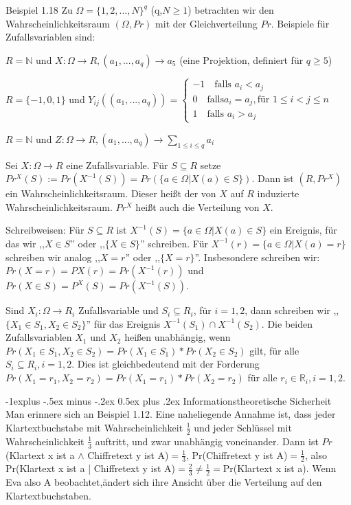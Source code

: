 \documentclass[a4paper]{article}
\makeatletter
\renewcommand{\subsection}{\@startsection{subsection}{2}{0mm}%
 {-1explus -.5ex minus -.2ex}%
 {0.5ex plus .2ex}%
 {\normalfont\normalsize\bfseries}}
\makeatother
\begin{document}
\begin{multicols}{3}
    Beispiel 1.18 Zu $\Omega=\{1,2,...,N\}^q$ (q,$N\geq 1$) betrachten wir den Wahrscheinlichkeitsraum $(\Omega,Pr)$ mit der Gleichverteilung $Pr$. Beispiele für Zufallsvariablen sind:
    \begin{itemize*}
        \item $R=\mathbb{N}$ und $X:\Omega\rightarrow R,(a_1,...,a_q)\rightarrow a_5$ (eine Projektion, definiert für $q\geq 5$)
        \item $R=\{-1,0,1\}$ und $Y_{ij}((a_1,...,a_q))=\begin{cases} -1\quad\text{falls } a_i< a_j\\ 0\quad\text{falls} a_i=a_j, \text{für } 1\leq i < j\leq n \\ 1\quad\text{falls } a_i> a_j\end{cases}$
        \item $R=\mathbb{N}$ und $Z:\Omega\rightarrow R,(a_1 ,...,a_q)\rightarrow\sum_{1\leq i\leq q} a_i$
    \end{itemize*}

    Sei $X:\Omega\rightarrow R$ eine Zufallsvariable. Für $S\subseteq R$ setze $Pr^X(S):= Pr(X^{-1}(S))=Pr(\{a\in\Omega|X(a)\in S\})$. Dann ist $(R,Pr^X)$ ein Wahrscheinlichkeitsraum. Dieser heißt der von $X$ auf $R$ induzierte Wahrscheinlichkeitsraum. $Pr^X$ heißt auch die Verteilung von $X$.

    Schreibweisen: Für $S\subseteq R$ ist $X^{-1}(S)=\{a\in\Omega|X(a)\in S\}$ ein Ereignis, für das wir ,,$X\in S$'' oder ,,$\{X\in S\}$'' schreiben. Für $X^{-1}(r)=\{a\in\Omega|X(a) =r\}$ schreiben wir analog ,,$X=r$'' oder ,,$\{X=r\}$''. Insbesondere schreiben wir: $Pr(X=r)=PX(r)=Pr(X^{-1}(r))$ und $Pr(X\in S)=P^X(S)=Pr(X^{-1}(S))$.

    Sind $X_i:\Omega\rightarrow R_i$ Zufallsvariable und $S_i\subseteq R_i$, für $i=1,2$, dann schreiben wir ,,$\{X_1\in S_1,X_2\in S_2\}$'' für das Ereignis $X^{-1}(S_1)\cap X^{-1}(S_2)$. Die beiden Zufallsvariablen $X_1$ und $X_2$ heißen unabhängig, wenn $Pr(X_1\in S_1,X_2\in S_2)=Pr(X_1\in S_1)*Pr(X_2\in S_2)$ gilt, für alle $S_i\subseteq R_i,i=1,2$. Dies ist gleichbedeutend mit der Forderung $Pr(X_1=r_1,X_2=r_2)=Pr(X_1=r_1)*Pr(X_2=r_2)$ für alle $r_i\in\mathbb{R}_i, i=1,2$.


    \subsection{Informationstheoretische Sicherheit}
    Man erinnere sich an Beispiel 1.12. Eine naheliegende Annahme ist, dass jeder Klartextbuchstabe mit Wahrscheinlichkeit $\frac{1}{2}$ und jeder Schlüssel mit Wahrscheinlichkeit $\frac{1}{3}$ auftritt, und zwar unabhängig voneinander. Dann ist $Pr$(Klartext x ist a $\wedge$ Chiffretext y ist A)$=\frac{1}{3}$, Pr(Chiffretext y ist A)$=\frac{1}{2}$, also Pr(Klartext x ist a | Chiffretext y ist A)$=\frac{2}{3}\not=\frac{1}{2}=$Pr(Klartext x ist a). Wenn Eva also A beobachtet,ändert sich ihre Ansicht über die Verteilung auf den Klartextbuchstaben.


\end{multicols}
\end{document}
